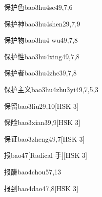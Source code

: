 \begin{entry}{保护色}{bao3hu4se4}{9,7,6}
\end{entry}

\begin{entry}{保护神}{bao3hu4shen2}{9,7,9}
\end{entry}

\begin{entry}{保护物}{bao3hu4 wu4}{9,7,8}
\end{entry}

\begin{entry}{保护性}{bao3hu4xing4}{9,7,8}
\end{entry}

\begin{entry}{保护者}{bao3hu4zhe3}{9,7,8}
\end{entry}

\begin{entry}{保护主义}{bao3hu4zhu3yi4}{9,7,5,3}
\end{entry}

\begin{entry}{保留}{bao3liu2}{9,10}[HSK 3]
\end{entry}

\begin{entry}{保险}{bao3xian3}{9,9}[HSK 3]
\end{entry}

\begin{entry}{保证}{bao3zheng4}{9,7}[HSK 3]
\end{entry}

\begin{entry}{报}{bao4}{7}[Radical 手][HSK 3]
\end{entry}

\begin{entry}{报酬}{bao4chou5}{7,13}
\end{entry}

\begin{entry}{报到}{bao4dao4}{7,8}[HSK 3]
\end{entry}


